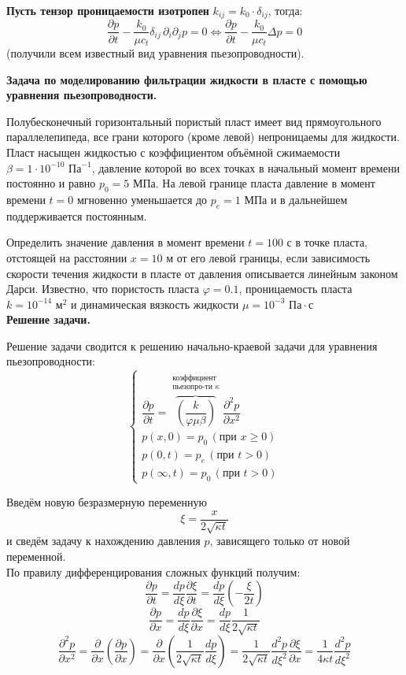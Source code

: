 \documentclass[a4paper,14pt]{extarticle}
\newcommand{\beq}{\begin{equation}}
\newcommand{\eeq}{\end{equation}}
\begin{document}
\textbf{Пусть тензор проницаемости изотропен} $k_{ij}=k_0\cdot\delta_{ij}$, тогда:
\beq
\frac{\partial p}{\partial t}-\frac{k_0}{\mu c_t}\delta_{ij}\,\partial_i\partial_{\!j} p=0\Leftrightarrow\frac{\partial p}{\partial t}-\frac{k_0}{\mu c_t}\Delta p=0
\eeq
(получили всем известный вид уравнения пьезопроводности).
\newpage

\textbf{Задача по моделированию фильтрации жидкости в пласте с помощью уравнения пьезопроводности.}

Полубесконечный горизонтальный пористый пласт имеет вид прямоугольного параллелепипеда, все грани которого (кроме левой) непроницаемы для жидкости.
Пласт насыщен жидкостью с коэффициентом объёмной сжимаемости $\beta=1\cdot 10^{-10}\text{ Па}^{-1}$, давление которой во всех точках в начальный момент времени постоянно и равно $p_0=5\text{ МПа}$.
На левой границе пласта давление в момент времени $t=0$ мгновенно уменьшается до $p_e=1\text{ МПа}$ и в дальнейшем поддерживается постоянным.

Определить значение давления в момент времени $t=100\text{ с}$ в точке пласта, отстоящей на расстоянии $x=10\text{ м}$ от его левой границы, если зависимость скорости течения жидкости в пласте от давления описывается линейным законом Дарси.
Известно, что пористость пласта $\varphi=0.1$, проницаемость пласта $k=10^{-14}\text{ м}^2$ и динамическая вязкость жидкости $\mu=10^{-3}\text{ Па}\cdot\text{с}$
\\

\textbf{Решение задачи.}

Решение задачи сводится к решению начально-краевой задачи для уравнения пьезопроводности:
\beq\label{InitialTask}
\begin{cases}
\dfrac{\partial p}{\partial t}=\overbrace{\left(\dfrac{k}{\varphi\mu\beta}\right)}^{\substack{\text{коэффициент}\\\text{пьезопро-ти }\kappa}}\dfrac{\partial^2 p}{\partial x^2}\\
p(x,0)=p_0 \,(\text{при }x\geqslant0)\\
p(0,t)=p_e \,(\text{при }t>0)\\
p(\infty, t)=p_0 \,(\text{при }t>0)
\end{cases}
\eeq

Введём новую безразмерную переменную
\beq\label{NewVar}
\xi=\dfrac{x}{2\sqrt{\kappa t}}
\eeq
и сведём задачу к нахождению давления $p$, зависящего только от новой переменной.
\\

По правилу дифференцирования сложных функций получим:
\beq
\frac{\partial p}{\partial t}=\frac{d p}{d\xi}\frac{\partial\xi}{\partial t}=\frac{d p}{d\xi}\left(-\frac{\xi}{2t}\right)
\eeq
\beq
\frac{\partial p}{\partial x}=\frac{d p}{d\xi}\frac{\partial\xi}{\partial x}=\frac{d p}{d\xi}\frac{1}{2\sqrt{\kappa t}}
\eeq
\beq
\frac{\partial^2p}{\partial x^2}=\frac{\partial}{\partial x}\left(\frac{\partial p}{\partial x}\right)=\frac{\partial}{\partial x}\left(\frac{1}{2\sqrt{\kappa t}}\frac{dp}{d\xi}\right)=\frac{1}{2\sqrt{\kappa t}}\frac{d^2p}{d\xi^2}\frac{\partial\xi}{\partial x}=\frac{1}{4\kappa t}\frac{d^2p}{d\xi^2}
\eeq
\\
\end{document}
